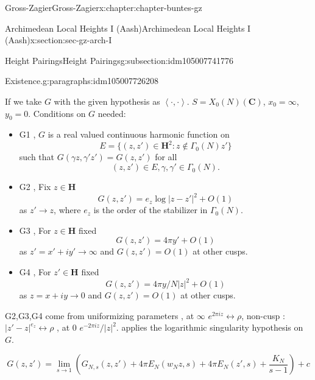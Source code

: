 \documentclass[oneside,10pt,]{book}
\numberwithin{equation}{section}
\newcommand{\pair}[2]{\left\langle #1, #2 \right\rangle}
\newcommand{\CC}{\mathbf{C}}
\newcommand{\HH}{\mathbf{H}}
\begin{document}
\begin{chapterptx}{Gross-Zagier}{}{Gross-Zagier}{}{}{x:chapter:chapter-buntes-gz}
\begin{sectionptx}{Archimedean Local Heights I (Aash)}{}{Archimedean Local Heights I (Aash)}{}{}{x:section:sec-gz-arch-I}
\begin{subsectionptx}{Height Pairings}{}{Height Pairings}{}{}{g:subsection:idm105007741776}
\begin{paragraphs}{Existence.}{g:paragraphs:idm105007726208}
\begin{equation*}
\end{equation*}
%
\par
If we take \(G\) with the given hypothesis as \(\pair\cdot\cdot\). \(S  = X_0(N)(\CC)\), \(x_0 = \infty \), \(y_0 = 0\). Conditions on \(G\) needed:%
\begin{itemize}[label=\textbullet]
\item{}G1 , \(G\) is a real valued continuous harmonic function on%
\begin{equation*}
E = \{ (z,z') \in \HH^2 : z\not \in \Gamma _0(N) z'\}
\end{equation*}
such that \(G(\gamma  z, \gamma 'z') = G(z,z')\) for all%
\begin{equation*}
(z,z')\in E, \gamma ,\gamma '\in \Gamma _0(N)\text{.}
\end{equation*}
%
\item{}G2 , Fix \(z\in \HH\)%
\begin{equation*}
G(z,z') = e_z\log|z- z'|^2 + O(1)
\end{equation*}
as \(z'\to z\), where \(e_z\) is the order of the stabilizer in \(\Gamma _0(N)\).%
\item{}G3 , For \(z\in \HH\) fixed%
\begin{equation*}
G(z,z') = 4\pi  y' + O(1)
\end{equation*}
as \(z' = x' + iy' \to \infty \) and \(G(z,z') = O(1)\) at other cusps.%
\item{}G4 , For \(z'\in \HH\) fixed%
\begin{equation*}
G(z,z') = 4\pi  y/N|z|^2 + O(1)
\end{equation*}
as \(z = x + iy \to 0 \) and \(G(z,z') = O(1)\) at other cusps.%
\end{itemize}
%
\par
G2,G3,G4 come from uniformizing parameters , at \(\infty \) \(e^{2\pi i z} \leftrightarrow \rho \), non-cusp : \(|z' -z|^{e_z} \leftrightarrow \rho \) , at 0 \(e^{-2\pi i z}/|z|^2\). applies the logarithmic singularity hypothesis on \(G\).%
\par
%
\begin{equation*}
G(z,z') = \lim_{s\to 1} \left( G_{N,s} (z,z') + 4 \pi  E_N(w_N z, s) + 4 \pi  E_N(z', s) + \frac{K_N}{s-1}\right) + c
\end{equation*}
%
\end{paragraphs}%
\end{subsectionptx}
\end{sectionptx}
%
%
\typeout{************************************************}

\end{chapterptx}
\end{document}
